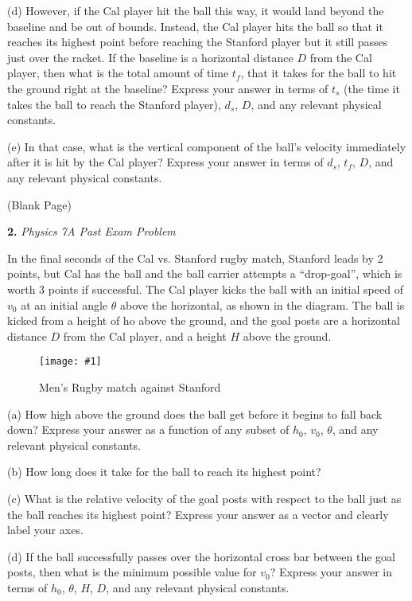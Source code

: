 \documentclass[11pt]{article}
\newcommand{\fig}[4]{
    \begin{figure}[H]
        \centering
        \texttt{[image: \#1]}
        \caption{#2}
        \label{exp4fit}
    \end{figure}
}
\theoremstyle{gangnamstyle}{\newtheorem{definition}{Definition}[]}
\theoremstyle{gangnamstyle}{\newtheorem{example}{Example}[]}
\theoremstyle{gangnamstyle}{\newtheorem{problem}{Problem}[]}
\begin{document}
(d) However, if the Cal player hit the ball this way, it would land beyond the baseline and be out of bounds. Instead, the Cal player hits the ball so that it reaches its highest point before reaching the Stanford player but it still passes just over the racket. If the baseline is a horizontal distance $D$ from the Cal player, then what is the total amount of time $t_f$, that it takes for the ball to hit the ground right at the baseline? Express your answer in terms of $t_s$ (the time it takes the ball to reach the Stanford player), $d_s$, $D$, and any relevant physical constants. 

(e) In that case, what is the vertical component of the ball’s velocity immediately after it is hit by the Cal player? Express your answer in terms of $d_s$, $t_f$, $D$, and any relevant physical constants. 

\pagebreak

\begin{center}
(Blank Page)
\end{center}

\pagebreak

\textbf{2.} \textit{Physics 7A Past Exam Problem}

In the final seconds of the Cal vs. Stanford rugby match, Stanford leads by 2 points, but Cal has the ball and the ball carrier attempts a “drop-goal”, which is worth 3 points if successful. The Cal player kicks the ball with an initial speed of $v_0$ at an initial angle $\theta$ above the horizontal, as shown in the diagram. The ball is kicked from a height of ho above the ground, and the goal posts are a horizontal distance $D$ from the Cal player, and a height $H$ above the ground. 

\fig{figs/mt1/f191.png}{Men’s Rugby match against Stanford}{0.5}{0}

(a) How high above the ground does the ball get before it begins to fall back down? Express your answer as a function of any subset of $h_0$, $v_0$, $\theta$, and any relevant physical constants. 

(b) How long does it take for the ball to reach its highest point?

(c) What is the relative velocity of the goal posts with respect to the ball just as the ball reaches its highest point? Express your answer as a vector and clearly label your axes. 

(d) If the ball successfully passes over the horizontal cross bar between the goal posts, then what is the minimum possible value for $v_0$? Express your answer in terms of $h_0$, $\theta$, $H$, $D$, and any relevant physical constants.
\end{document}
